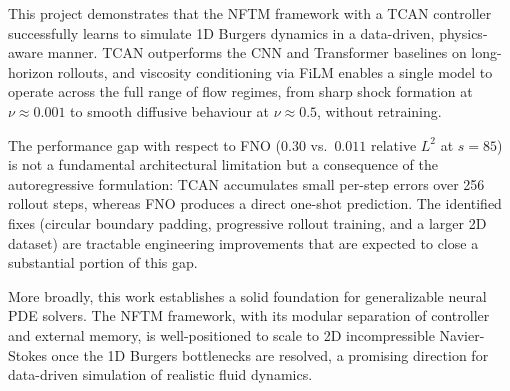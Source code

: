 This project demonstrates that the NFTM framework with a TCAN controller successfully learns to simulate 1D Burgers dynamics in a data-driven, physics-aware manner. TCAN outperforms the CNN and Transformer baselines on long-horizon rollouts, and viscosity conditioning via FiLM enables a single model to operate across the full range of flow regimes, from sharp shock formation at $\nu \approx 0.001$ to smooth diffusive behaviour at $\nu \approx 0.5$, without retraining.

The performance gap with respect to FNO ($0.30$ vs.\ $0.011$ relative $L^2$ at $s=85$) is not a fundamental architectural limitation but a consequence of the autoregressive formulation: TCAN accumulates small per-step errors over 256 rollout steps, whereas FNO produces a direct one-shot prediction. The identified fixes (circular boundary padding, progressive rollout training, and a larger 2D dataset) are tractable engineering improvements that are expected to close a substantial portion of this gap.

More broadly, this work establishes a solid foundation for generalizable neural PDE solvers. The NFTM framework, with its modular separation of controller and external memory, is well-positioned to scale to 2D incompressible Navier-Stokes once the 1D Burgers bottlenecks are resolved, a promising direction for data-driven simulation of realistic fluid dynamics.


